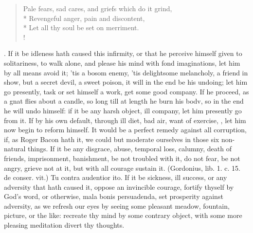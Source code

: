 {\begin{verse}
Pale fears, sad cares, and griefs which do it grind,\\*
Revengeful anger, pain and discontent,\\*
Let all thy soul be set on merriment.\\!
\end{verse}%
%
. If it be idleness hath
caused this infirmity, or that he perceive himself given to
solitariness, to walk alone, and please his mind with fond
imaginations, let him by all means avoid it; 'tis a bosom enemy, 'tis
delightsome melancholy, a friend in show, but a secret devil, a sweet
poison, it will in the end be his undoing; let him go presently, task
or set himself a work, get some good company. If he proceed, as a gnat
flies about a candle, so long till at length he burn his bodv, so in
the end he will undo himself: if it be any harsh object, ill company,
let him presently go from it. If by his own default, through ill diet,
bad air, want of exercise, \etc{}, let him now begin to reform himself. It
would be a perfect remedy against all corruption, if, as Roger
Bacon hath it, we could but moderate ourselves in those six non-natural
things. If it be any disgrace, abuse, temporal loss, calumny,
death of friends, imprisonment, banishment, be not troubled with it, do
not fear, be not angry, grieve not at it, but with all courage sustain
it. (Gordonius, lib. 1. c. 15. de conser. vit.) Tu contra audentior
ito. If it be sickness, ill success, or any adversity that hath
caused it, oppose an invincible courage, fortify thyself by God's word,
or otherwise, mala bonis persuadenda, set prosperity against adversity,
as we refresh our eyes by seeing some pleasant meadow, fountain,
picture, or the like: recreate thy mind by some contrary object, with
some more pleasing meditation divert thy thoughts.

}
